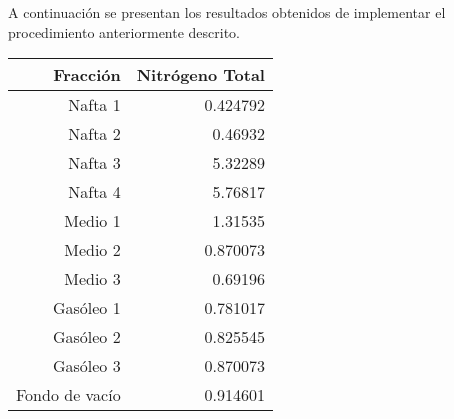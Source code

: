 \documentclass[12pt]{article}
\begin{document}
A continuación se presentan los resultados obtenidos de implementar el procedimiento anteriormente descrito.
\vspace{40 pt}
\begin{large}
\begin{table}[H]
  \centering
    \begin{tabular}{|r|r|}
    \hline
     Fracción & Nitrógeno Total \\
    \hline\hline
     Nafta 1  & 0.424792  \\
     Nafta 2 & 0.46932  \\
     Nafta 3 & 5.32289  \\
     Nafta 4 & 5.76817  \\
     Medio 1 & 1.31535  \\
     Medio 2 & 0.870073 \\
     Medio 3 & 0.69196\\
     Gasóleo 1 & 0.781017 \\
     Gasóleo 2 & 0.825545 \\
     Gasóleo 3 & 0.870073  \\
     Fondo de vacío & 0.914601  \\
    \hline
    \end{tabular}%
\end{table}%
\end{large}
\end{document}
